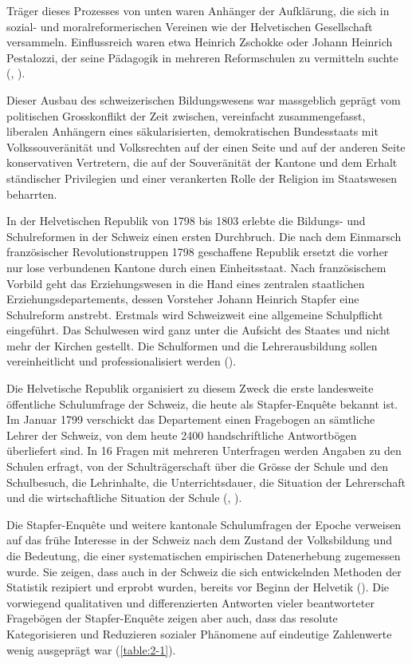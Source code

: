 Träger dieses Prozesses von unten waren Anhänger der Aufklärung, die sich in sozial- und moralreformerischen Vereinen wie der Helvetischen Gesellschaft versammeln. Einflussreich waren etwa Heinrich Zschokke oder Johann Heinrich Pestalozzi, der seine Pädagogik in mehreren Reformschulen zu vermitteln suchte (\cite{graf_pestalozzi_2022}, \cite[68]{butikofer_staat_2006}).

\pagebreak

Dieser Ausbau des schweizerischen Bildungswesens war massgeblich geprägt vom politischen Grosskonflikt der Zeit zwischen, vereinfacht zusammengefasst, liberalen Anhängern eines säkularisierten, demokratischen Bundesstaats mit Volkssouveränität und Volksrechten auf der einen Seite und auf der anderen Seite konservativen Vertretern, die auf der Souveränität der Kantone und dem Erhalt ständischer Privilegien und einer verankerten Rolle der Religion im Staatswesen beharrten.

In der Helvetischen Republik von 1798 bis 1803 erlebte die Bildungs- und Schulreformen in der Schweiz einen ersten Durchbruch. Die nach dem Einmarsch französischer Revolutionstruppen 1798 geschaffene Republik ersetzt die vorher nur lose verbundenen Kantone durch einen Einheitsstaat. Nach französischem Vorbild geht das Erziehungswesen in die Hand eines zentralen staatlichen Erziehungsdepartements, dessen Vorsteher Johann Heinrich Stapfer eine Schulreform anstrebt. Erstmals wird Schweizweit eine allgemeine Schulpflicht eingeführt. Das Schulwesen wird ganz unter die Aufsicht des Staates und nicht mehr der Kirchen gestellt. Die Schulformen und die Lehrerausbildung sollen vereinheitlicht und professionalisiert werden (\cite{butikofer_staat_2006}). 

Die Helvetische Republik organisiert zu diesem Zweck die erste landesweite öffentliche Schulumfrage der Schweiz, die heute als Stapfer-Enquête bekannt ist. Im Januar 1799 verschickt das Departement einen Fragebogen an sämtliche Lehrer der Schweiz, von dem heute 2400 handschriftliche Antwortbögen überliefert sind. In 16 Fragen mit mehreren Unterfragen werden Angaben zu den Schulen erfragt, von der Schulträgerschaft über die Grösse der Schule und den Schulbesuch, die Lehrinhalte, die Unterrichtsdauer, die Situation der Lehrerschaft und die wirtschaftliche Situation der Schule (\cite{schmidt_stapfer-enquete_2015}, \cite{trohler_volksschule_2014}). 

Die Stapfer-Enquête und weitere kantonale Schulumfragen der Epoche verweisen auf das frühe Interesse in der Schweiz nach dem Zustand der Volksbildung und die Bedeutung, die einer systematischen empirischen Datenerhebung zugemessen wurde. Sie zeigen, dass auch in der Schweiz die sich entwickelnden Methoden der Statistik rezipiert und erprobt wurden, bereits vor Beginn der Helvetik (\cite{rothen_vergessenen_2014}). Die vorwiegend qualitativen und differenzierten Antworten vieler beantworteter Fragebögen der Stapfer-Enquête zeigen aber auch, dass das resolute Kategorisieren und Reduzieren sozialer Phänomene auf eindeutige Zahlenwerte wenig ausgeprägt war (\cref{table:2-1}).

